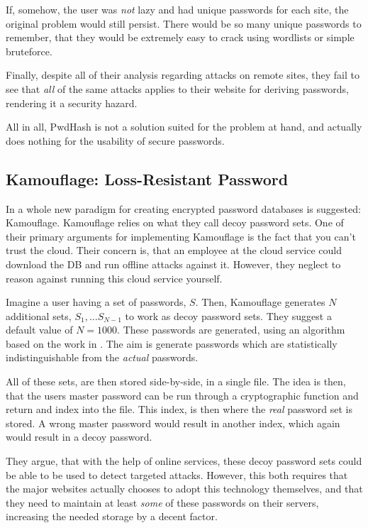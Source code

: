 			If, somehow, the user was \emph{not} lazy and had unique passwords for each site, the original problem would still persist. There would be so many unique passwords to remember, that they would be extremely easy to crack using wordlists or simple bruteforce.

			Finally, despite all of their analysis regarding attacks on remote sites, they fail to see that \emph{all} of the same attacks applies to their website for deriving passwords, rendering it a security hazard.

			All in all, PwdHash is not a solution suited for the problem at hand, and actually does nothing for the usability of secure passwords.

		\subsection*{Kamouflage: Loss-Resistant Password}
			In \cite{kamouflage} a whole new paradigm for creating encrypted password databases is suggested: Kamouflage. Kamouflage relies on what they call decoy password sets. One of their primary arguments for implementing Kamouflage is the fact that you can't trust the cloud. Their concern is, that an employee at the cloud service could download the DB and run offline attacks against it. However, they neglect to reason against running this cloud service yourself.

			Imagine a user having a set of passwords, $S$. Then, Kamouflage generates $N$ additional sets, $S_1, \dots S_{N-1}$ to work as decoy password sets. They suggest a default value of $N=1000$. These passwords are generated, using an algorithm based on the work in \cite{cracking}. The aim is generate passwords which are statistically indistinguishable from the \emph{actual} passwords. 

			All of these sets, are then stored side-by-side, in a single file. The idea is then, that the users master password can be run through a cryptographic function and return and index into the file. This index, is then where the \emph{real} password set is stored. A wrong master password would result in another index, which again would result in a decoy password.

			They argue, that with the help of online services, these decoy password sets could be able to be used to detect targeted attacks. However, this both requires that the major websites actually chooses to adopt this technology themselves, and that they need to maintain at least \emph{some} of these passwords on their servers, increasing the needed storage by a decent factor.

